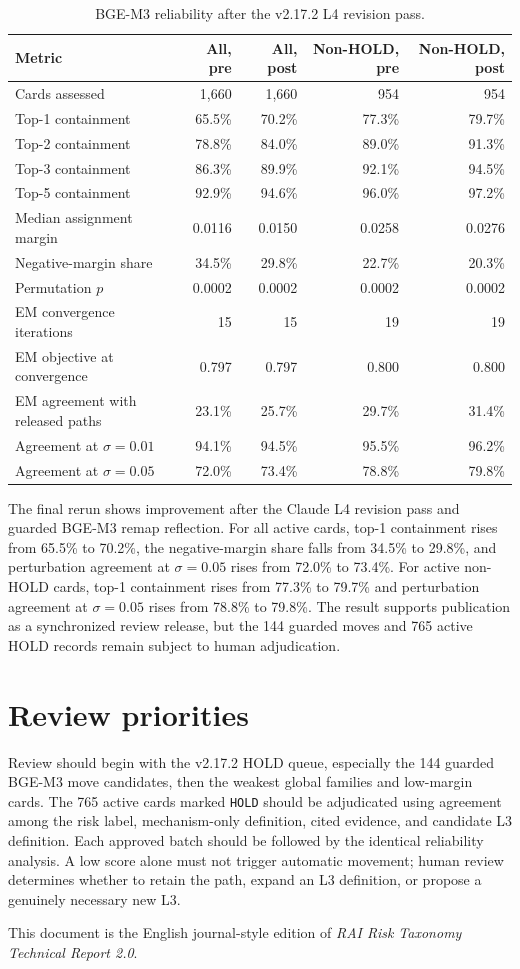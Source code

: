 \documentclass[11pt,a4paper]{article}
\newcommand{\code}[1]{\texttt{#1}}
\begin{document}
\begin{table}[ht]
\centering
\caption{BGE-M3 reliability after the v2.17.2 L4 revision pass.}
\label{tab:v2172-bge-active}
\begin{tabular}{lrrrr}
\toprule
Metric & All, pre & All, post & Non-HOLD, pre & Non-HOLD, post \\
\midrule
Cards assessed & 1,660 & 1,660 & 954 & 954 \\
Top-1 containment & 65.5\% & 70.2\% & 77.3\% & 79.7\% \\
Top-2 containment & 78.8\% & 84.0\% & 89.0\% & 91.3\% \\
Top-3 containment & 86.3\% & 89.9\% & 92.1\% & 94.5\% \\
Top-5 containment & 92.9\% & 94.6\% & 96.0\% & 97.2\% \\
Median assignment margin & 0.0116 & 0.0150 & 0.0258 & 0.0276 \\
Negative-margin share & 34.5\% & 29.8\% & 22.7\% & 20.3\% \\
Permutation $p$ & 0.0002 & 0.0002 & 0.0002 & 0.0002 \\
EM convergence iterations & 15 & 15 & 19 & 19 \\
EM objective at convergence & 0.797 & 0.797 & 0.800 & 0.800 \\
EM agreement with released paths & 23.1\% & 25.7\% & 29.7\% & 31.4\% \\
Agreement at $\sigma=0.01$ & 94.1\% & 94.5\% & 95.5\% & 96.2\% \\
Agreement at $\sigma=0.05$ & 72.0\% & 73.4\% & 78.8\% & 79.8\% \\
\bottomrule
\end{tabular}
\end{table}

The final rerun shows improvement after the Claude L4 revision pass and
guarded BGE-M3 remap reflection. For all active cards, top-1 containment rises
from 65.5\% to 70.2\%, the negative-margin share falls from 34.5\% to 29.8\%,
and perturbation agreement at $\sigma=0.05$ rises from 72.0\% to 73.4\%.
For active non-HOLD cards, top-1 containment rises from 77.3\% to 79.7\% and
perturbation agreement at $\sigma=0.05$ rises from 78.8\% to 79.8\%. The
result supports publication as a synchronized review release, but the 144
guarded moves and 765 active HOLD records remain subject to human adjudication.

\section{Review priorities}

Review should begin with the v2.17.2 HOLD queue, especially the 144 guarded
BGE-M3 move candidates, then the weakest global families and low-margin cards.
The 765 active cards marked \code{HOLD} should be adjudicated using agreement
among the risk label, mechanism-only definition, cited evidence, and candidate
L3 definition. Each approved batch should be followed by the identical
reliability analysis. A low score alone must not trigger automatic movement;
human review determines whether to retain the path, expand an L3 definition,
or propose a genuinely necessary new L3.

This document is the English journal-style edition of \textit{RAI Risk
Taxonomy Technical Report 2.0}.
\end{document}
